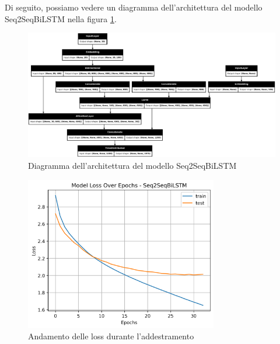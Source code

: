 Di seguito, possiamo vedere un diagramma dell'architettura del modello Seq2SeqBiLSTM nella figura \ref{fig:seq2seqbilstm_model_architecture}.

\begin{figure}[H]
    \centering
    \includegraphics[width=1\textwidth]{media/Seq2SeqBiLSTM_image.png}
    \caption{Diagramma dell'architettura del modello Seq2SeqBiLSTM}
    \label{fig:seq2seqbilstm_model_architecture}
\end{figure}


\begin{figure}[H]
    \centering
    \includegraphics[width=0.75\textwidth]{media/Seq2SeqBiLSTM_originale_lossplot.png}
    \caption{Andamento delle loss durante l'addestramento}
    \label{fig:seq2seqbilstm_loss_plot}
\end{figure}
